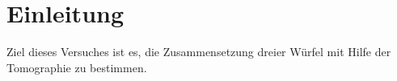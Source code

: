 

\section{Einleitung}

Ziel dieses Versuches ist es, die Zusammensetzung dreier Würfel mit Hilfe der
Tomographie zu bestimmen.
